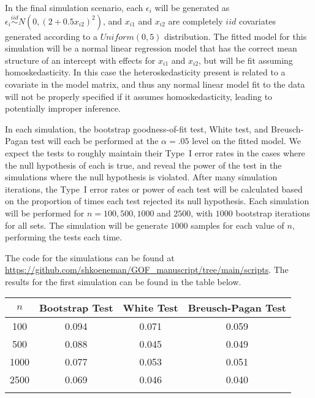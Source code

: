 \documentclass[12pt]{article} %
\theoremstyle{definition}
\begin{document}
In the final simulation scenario, each $\epsilon_i$ will be generated as $\epsilon_i \stackrel{iid}{\sim} N \left( 0,(2 + 0.5 x_{i2})^2 \right)$, and $x_{i1}$ and $x_{i2}$ are completely $iid$ covariates generated according to
a $Uniform(0,5)$ distribution. The fitted model for this simulation will be a normal linear regression model that has the correct mean structure of an intercept with effects for $x_{i1}$ and $x_{i2}$,
but will be fit assuming homoskedasticity. In this case the heteroskedasticity present is related to a covariate in the model matrix, and thus any normal linear model fit to the data will not be properly
specified if it assumes homoskedasticity, leading to potentially improper inference.

In each simulation, the bootstrap goodness-of-fit test, White test, and Breusch-Pagan test will each be performed at the $\alpha = .05$ level on the  fitted model. We expect the tests to roughly maintain their
Type~I error rates in the cases where the null hypothesis of each is true, and reveal the power of the test in the simulations where the null hypothesis is violated. After many simulation iterations, the
Type~I error rates or power of each test will be calculated based on the proportion of times each test rejected its null hypothesis. Each simulation will be performed for $n = 100, 500, 1000$ and $2500$, with $1000$
bootstrap iterations for all sets. The simulation will be generate $1000$ samples for each value of $n$, performing the tests each time.

The code for the simulations can be found at \url{https://github.com/shkoeneman/GOF_manuscript/tree/main/scripts}. The results for the first simulation
can be found in the table below.

\begin{table}[H]
	\centering
	\small\addtolength{\tabcolsep}{-3pt}
	\setlength\extrarowheight{-3pt}
	{
	\begin{tabular}{ c|c|c|c}
	$n$ & Bootstrap Test & White Test & Breusch-Pagan Test \\
	 \hline
	 100 & 0.094 & 0.071 & 0.059 \\
	 500 & 0.088 & 0.045 & 0.049 \\
	 1000 & 0.077 & 0.053 & 0.051 \\
	 2500 & 0.069 & 0.046 & 0.040 \\
	 \Xhline{3\arrayrulewidth}
	\end{tabular}
	}
\end{table}
\end{document}
